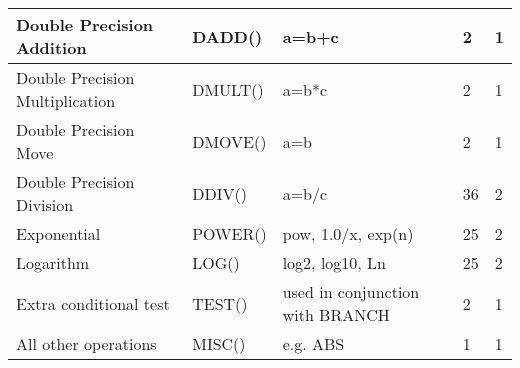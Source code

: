 \begin{center}
\begin{longtable}{|m{3.5cm}|m{2.2cm}|m{3.5cm}|m{2.8cm}|m{1.5cm}|}
\hline
Double Precision Addition	&DADD()	&a=b+c	&2&	1\\
\hline
Double Precision Multiplication	&DMULT()	&a=b*c	& 2&	1\\
\hline
Double Precision Move	&DMOVE()	&a=b&	2	&1\\
\hline
Double Precision Division	&DDIV()&	a=b/c	&36&	2\\
\hline
Exponential	& POWER()	& pow, 1.0/x, exp(n)	&25	&2 \\
\hline
Logarithm	&LOG()&	log2, log10, Ln	&25	&2\\
\hline
Extra conditional test& 	TEST()&	used in conjunction with BRANCH &	2	&1\\
\hline
All other operations&	MISC()&	e.g. ABS&	1	&1\\
\hline
\end{longtable}
\end{center}

